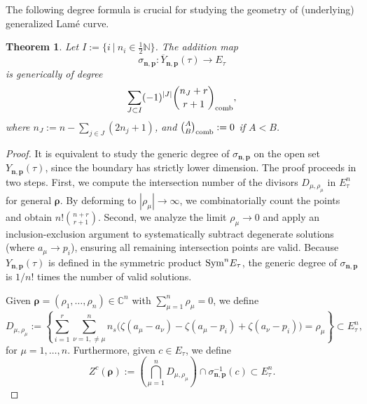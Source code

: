 \documentclass[11pt]{amsart}
\newtheorem{theorem}{Theorem}[section]
\theoremstyle{remark}
\numberwithin{equation}{section}
\begin{document}
The following degree formula is crucial for studying the geometry of (underlying) generalized Lam\'e curve. 
\begin{theorem} \label{thm_deg}
Let $I := \{ i\ |\ n_i \in \tfrac{1}{2}\mathbb{N} \}$. The addition map
\[
\sigma_{\mathbf{n},\mathbf{p}}: \overline{Y}_{\mathbf{n},\mathbf{p}}(\tau) \to E_\tau
\] 
is generically of degree 
\[
    \sum_{J \subset I} (-1)^{|J|} \binom{n_J +r}{r+1}_{\rm comb},
\]
where $n_J := n - \sum_{j \in J}(2n_j +1)$, and $\binom{A}{B}_{\rm comb} := 0$ if $A<B$.
\end{theorem}
\begin{proof}
It is equivalent to study the generic degree of $\sigma_{\mathbf{n},\mathbf{p}}$ on the open set $Y_{\mathbf{n}, \mathbf{p}}(\tau)$, since the boundary has strictly lower dimension.
The proof proceeds in two steps. First, we compute the intersection number of the divisors $D_{\mu,\rho_\mu}$ in $E_\tau^n$ for general $\boldsymbol{\rho}$. By deforming to $|\rho_\mu| \to \infty$, we combinatorially count the points and obtain $n! \binom{n+r}{r+1}$. Second, we analyze the limit $\rho_\mu \to 0$ and apply an inclusion-exclusion argument to systematically subtract degenerate solutions (where $a_\mu \to p_i$), ensuring all remaining intersection points are valid. Because $Y_{\mathbf{n},\mathbf{p}}(\tau)$ is defined in the symmetric product ${\rm Sym}^n E_\tau$, the generic degree of $\sigma_{\mathbf{n},\mathbf{p}}$ is $1/n!$ times the number of valid solutions.

Given $\boldsymbol{\rho}=(\rho_1,\dots,\rho_n) \in \mathbb{C}^n$ with $\sum_{\mu=1}^n \rho_\mu=0$, we define 
\[
D_{\mu,\rho_\mu} := \left\{ \sum_{i = 1}^{r} \sum_{\nu = 1, \neq \mu}^n 
n_s\Big(
\zeta(a_\mu - a_\nu) - \zeta(a_\mu - p_i) + \zeta(a_\nu - p_i)
\Big) =  \rho_\mu \right\} \subset E_{\tau}^n,
\]
for $\mu=1,\dots,n$. Furthermore, given $c \in E_\tau$, we define
\[
Z^c(\boldsymbol{\rho}) :=  \left( \bigcap_{\mu=1}^n D_{\mu,\rho_\mu}\right) \cap \sigma_{\mathbf{n},\mathbf{p}}^{-1}(c) \subset E_\tau^n.
\]


\end{proof}
\end{document}
